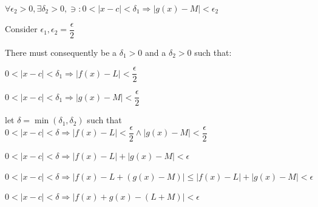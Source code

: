\documentclass{article}
\begin{document}
$\forall \epsilon_2 > 0, \exists \delta_2 > 0, \ni : 0 < |x - c| <\delta_1 \Longrightarrow |g(x) - M| < \epsilon_2$

Consider $\epsilon_1, \epsilon_2 = \dfrac{\epsilon}{2}$

There must consequently be a $\delta_1 > 0$ and a $\delta_2 > 0$ such that:

$0 < |x - c| < \delta_1 \Longrightarrow |f(x) - L| < \dfrac{\epsilon}{2}$

$0 < |x - c| < \delta_1 \Longrightarrow |g(x) - M| < \dfrac{\epsilon}{2}$

let $\delta = \min(\delta_1, \delta_2) $ such that $ 0 <|x - c| < \delta \Longrightarrow |f(x) - L| < \dfrac{\epsilon}{2} \land |g(x) - M| < \dfrac{\epsilon}{2}$

$0 <|x - c| < \delta \Longrightarrow |f(x) - L| + |g(x) - M| < \epsilon$

$0 <|x - c| < \delta \Longrightarrow |f(x) - L + (g(x) - M)| \leq |f(x) - L| + |g(x) - M| < \epsilon$

$0 <|x - c| < \delta \Longrightarrow |f(x) + g(x) - (L + M)| < \epsilon$
\end{document}
